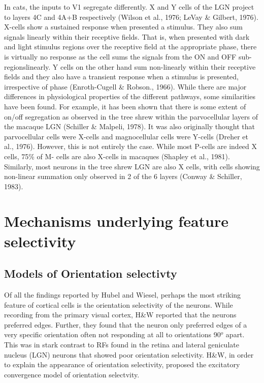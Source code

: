 In cats, the inputs to V1 segregate differently. X and Y cells of the LGN project to layers 4C and 4A+B respectively (Wilson et al., 1976; LeVay \& Gilbert, 1976). X-cells show a sustained response when presented a stimulus. They also sum signals linearly within their receptive fields. That is, when presented with dark and light stimulus regions over the receptive field at the appropriate phase, there is virtually no response as the cell sums the signals from the ON and OFF sub-regionslinearly. Y cells on the other hand sum non-linearly within their receptive fields and they also have a transient response when a stimulus is presented, irrespective of phase (Enroth-Cugell \& Robson., 1966).
While there are major differences in physiological properties of the different pathways, some similarities have been found. For example, it has been shown that there is some extent of on/off segregation as observed in the tree shrew within the parvocellular layers of the macaque LGN (Schiller \& Malpeli, 1978). It was also originally thought that parvocellular cells were X-cells and magnocellular cells were Y-cells (Dreher et al., 1976). However, this is not entirely the case. While most P-cells are indeed X cells, 75\% of M- cells are also X-cells in macaques (Shapley et al., 1981). Similarly, most neurons in the tree shrew LGN are also X cells, with cells showing non-linear summation only observed in 2 of the 6 layers (Conway \& Schiller, 1983).


\section{Mechanisms underlying feature selectivity}

\subsection{Models of Orientation selectivty}

Of all the findings reported by Hubel and Wiesel, perhaps the most striking feature of cortical cells is the orientation selectivity of the neurons. While recording from the primary visual cortex, H\&W reported that the neurons preferred edges. Further, they found that the neuron only preferred edges of a very specific orientation often not responding at all to orientations 90$^o$ apart. This was in stark contrast to RFs found in the retina and lateral geniculate nucleus (LGN) neurons that showed poor orientation selectivity. H\&W, in order to explain the appearance of orientation selectivity, proposed the excitatory convergence model of orientation selectvity.

